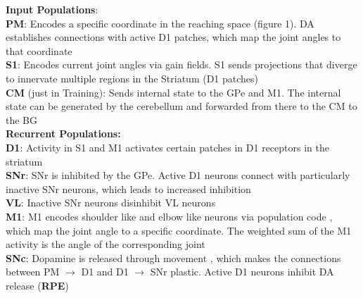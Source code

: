 \textbf{\textcolor{training-set}{Input Populations}}:\\[2pt]
\footnotesize
\textbf{PM}: Encodes a specific coordinate in the reaching space (figure 1). DA establishes connections with active D1 patches, which map the joint angles to that coordinate\\[2pt]
\textbf{S1}: Encodes current joint angles via gain fields. S1 sends projections that diverge to innervate multiple regions in the Striatum (D1 patches) \parencite{flahertyCorticostriatalTransformationsPrimate1991}\\[2pt]
\textbf{CM} (just in Training): Sends internal state to the GPe and M1. The internal state can be generated by the cerebellum \parencite{sendhilnathanCerebrocerebellarNetworkLearning2024} and forwarded from there to the CM to the BG\\[10pt]
\small
\textbf{Recurrent Populations:}\\[2pt]
\footnotesize
\textbf{D1}: Activity in S1 and M1 activates certain patches in D1 receptors in the striatum\\[2pt]
\textbf{SNr}: SNr is inhibited by the GPe. Active D1 neurons connect with particularly inactive SNr neurons, which leads to increased inhibition\\[2pt]
\textbf{VL}: Inactive SNr neurons disinhibit VL neurons\\[2pt]
\textbf{M1}: M1 encodes shoulder like and elbow like neurons via population code 
\parencite{pruszynskiPrimaryMotorCortex2011}, which map the joint angle to a specific coordinate. The weighted sum of the M1 activity is the angle of the corresponding joint\\[2pt]
\textbf{SNc}: Dopamine is released through movement \parencite{cheungLearningCriticallyDrives2023}, which makes the connections between PM $\rightarrow$ D1 and D1 $\rightarrow$ SNr plastic. Active D1 neurons inhibit DA release (\textbf{RPE})
